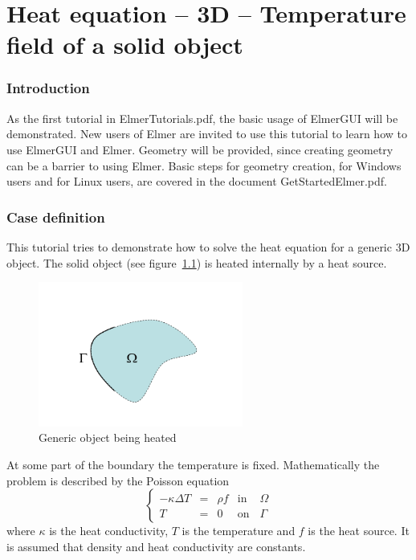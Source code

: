 \chapter{Heat equation -- 3D -- Temperature field of a solid object}



\subsection*{Introduction}

As the first tutorial in ElmerTutorials.pdf, the basic usage of ElmerGUI will be demonstrated.  New users of Elmer are invited to use this tutorial to learn how to use ElmerGUI and Elmer.  Geometry will be provided, since creating geometry can be a barrier to using Elmer.  Basic steps for geometry creation, for Windows users and for Linux users, are covered in the document GetStartedElmer.pdf.

\subsection*{Case definition}

This tutorial tries to demonstrate how to solve the heat equation for a generic 3D object. The solid object (see figure~\ref{fg:domain}) is heated internally by a heat source.

\begin{figure}[H]
\centering
\includegraphics[width=0.6\textwidth]{domain}
\caption{Generic object being heated}\label{fg:domain}
\end{figure}  

At some part of the boundary the temperature is fixed.  Mathematically the problem is described by the Poisson equation
\begin{equation}
\left \{
\begin{array}{ccccc}
- \kappa \Delta T &= &\rho f & \mathrm{ in } \, \, & \Omega \\
T&=&0 & \mathrm{ on } & \Gamma
\end{array}
\right .
\end{equation}
where $\kappa$ is the heat conductivity, $T$  is the temperature and $f$ is the heat source. It is assumed that density and heat conductivity are constants. 

